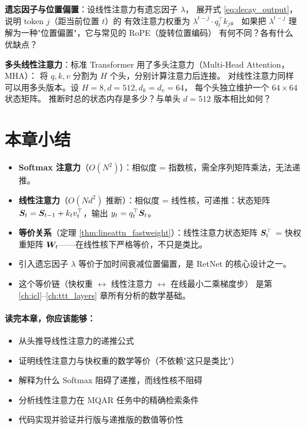 \begin{exercise}
\textbf{遗忘因子与位置偏置}：设线性注意力有遗忘因子 $\lambda$，
展开式 \eqref{eq:decay_output}，说明 token $j$（距当前位置 $t$）的
有效注意力权重为 $\lambda^{t-j} \cdot q_t^\top k_j$。
如果把 $\lambda^{t-j}$ 理解为一种"位置偏置"，它与常见的 RoPE（旋转位置编码）
有何不同？各有什么优缺点？
\end{exercise}

\begin{exercise}
\textbf{多头线性注意力}：标准 Transformer 用了多头注意力（Multi-Head Attention，MHA）：
将 $q, k, v$ 分割为 $H$ 个头，分别计算注意力后连接。
对线性注意力同样可以用多头版本。设 $H=8, d=512, d_k=d_v=64$，
每个头独立维护一个 $64 \times 64$ 状态矩阵。
推断时总的状态内存是多少？与单头 $d=512$ 版本相比如何？
\end{exercise}

\section{本章小结}
\label{sec:attn_summary}

\begin{itemize}
  \item \textbf{Softmax 注意力}（$O(N^2)$）：相似度 = 指数核，需全序列矩阵乘法，无法递推。

  \item \textbf{线性注意力}（$O(Nd^2)$ 推断）：相似度 = 线性核，可递推：状态矩阵 $\boldsymbol{S}_t = \boldsymbol{S}_{t-1} + k_t v_t^\top$，输出 $y_t = q_t^\top \boldsymbol{S}_t$。

  \item \textbf{等价关系}（定理 \ref{thm:lineattn_fastweight}）：线性注意力状态矩阵 $\boldsymbol{S}_t^\top$ = 快权重矩阵 $\boldsymbol{W}_t$——在线性核下严格等价，不只是类比。

  \item 引入遗忘因子 $\lambda$ 等价于加时间衰减位置偏置，是 RetNet 的核心设计之一。

  \item 这个等价链（快权重 $\leftrightarrow$ 线性注意力 $\leftrightarrow$ 在线最小二乘梯度步）
        是第 \ref{ch:icl}--\ref{ch:ttt_layers} 章所有分析的数学基础。
\end{itemize}

\paragraph{读完本章，你应该能够：}
\begin{itemize}
  \item 从头推导线性注意力的递推公式
  \item 证明线性注意力与快权重的数学等价（不依赖"这只是类比"）
  \item 解释为什么 Softmax 阻碍了递推，而线性核不阻碍
  \item 分析线性注意力在 MQAR 任务中的精确检索条件
  \item 代码实现并验证并行版与递推版的数值等价性
\end{itemize}
